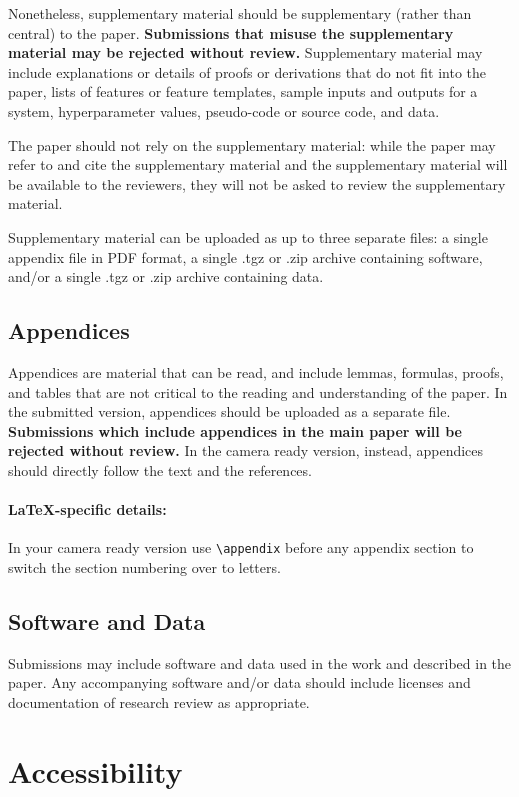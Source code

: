 \documentclass[11pt,a4paper]{article}
\begin{document}
Nonetheless, supplementary material should be supplementary (rather than central) to the paper.
\textbf{Submissions that misuse the supplementary material may be rejected without review.}
Supplementary material may include explanations or details of proofs or derivations that do not fit into the paper, lists of
features or feature templates, sample inputs and outputs for a system, hyperparameter values, pseudo-code or source code, and data.

The paper should not rely on the supplementary material: while the paper may refer to and cite the supplementary material and the supplementary material will be available to the reviewers, they will not be asked to review the supplementary material.

Supplementary material can be uploaded as up to three separate files: a single appendix file in PDF format, a single .tgz or .zip archive containing software, and/or a single .tgz or .zip archive containing data.



\subsection{Appendices}
\label{sec:appendix}
Appendices are material that can be read, and include lemmas, formulas, proofs, and tables that are not critical to the reading and understanding of the paper. 
In the submitted version, appendices should be uploaded as a separate file. \textbf{Submissions which include appendices in the main paper will be rejected without review.} In the camera ready version, instead, appendices should directly follow the text and the references. 

\paragraph{\LaTeX-specific details:}
In your camera ready version use {\small\verb|\appendix|} before any appendix section to switch the section numbering over to letters.

\subsection{Software and Data}
\label{sec:software_and_data}
Submissions may include software and data used in the work and described in the paper.
Any accompanying software and/or data should include licenses and documentation of research review as appropriate.

\section{Accessibility}
\label{ssec:accessibility}
\end{document}
